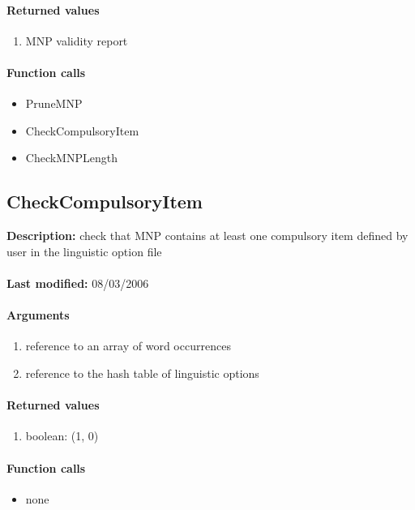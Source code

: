 \paragraph{Returned values}
\begin{enumerate}
\item MNP validity report
\end{enumerate}

\paragraph{Function calls}
\begin{itemize}
\item PruneMNP
\item CheckCompulsoryItem
\item CheckMNPLength
\end{itemize}

\subsection{CheckCompulsoryItem}
\textbf{Description:} check that MNP contains at least one compulsory item defined by user in the linguistic option file\\
\\\textbf{Last modified:} 08/03/2006

\paragraph{Arguments}
\begin{enumerate}
\item reference to an array of word occurrences
\item reference to the hash table of linguistic options
\end{enumerate}

\paragraph{Returned values}
\begin{enumerate}
\item boolean: (1, 0)
\end{enumerate}

\paragraph{Function calls}
\begin{itemize}
\item none
\end{itemize}

